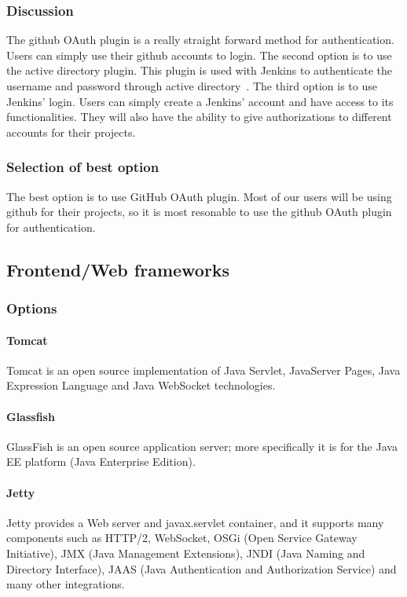 \documentclass[10pt,letterpaper,onecolumn,draftclsnofoot]{IEEEtran}
\begin{document}
\subsubsection{Discussion}
The github OAuth plugin is a really straight forward method for authentication.
Users can simply use their github accounts to login.
The second option is to use the active directory plugin.
This plugin is used with Jenkins to authenticate the username and password through active directory~\cite{activedirectory}.
The third option is to use Jenkins’ login.
Users can simply create a Jenkins’ account and have access to its functionalities.
They will also have the ability to give authorizations to different accounts for their projects.
\subsubsection{Selection of best option}
The best option is to use GitHub OAuth plugin.
Most of our users will be using github for their projects, so it is most resonable to use the github OAuth plugin for authentication.

\subsection{Frontend/Web frameworks}
\subsubsection{Options}
\paragraph{Tomcat}
Tomcat is an open source implementation of Java Servlet, JavaServer Pages, Java Expression Language and Java WebSocket technologies. 
\paragraph{Glassfish}
GlassFish is an open source application server; more specifically it is for the Java EE platform (Java Enterprise Edition).
\paragraph{Jetty}
Jetty provides a Web server and javax.servlet container, and it supports many components such as HTTP/2, WebSocket, OSGi (Open Service Gateway Initiative), JMX (Java Management Extensions), JNDI (Java Naming and Directory Interface), JAAS (Java Authentication and Authorization Service) and many other integrations.
\end{document}

